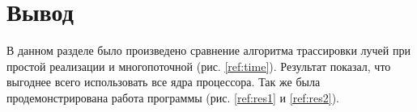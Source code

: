 \begin{figure}[ht!]
\end{figure}

\begin{figure}[ht!]
\end{figure}

\section{Вывод}

В данном разделе было произведено сравнение алгоритма трассировки лучей
при простой реализации и многопоточной (рис. \ref{ref:time}).
Результат показал, что выгоднее всего использовать все ядра процессора.
Так же была продемонстрирована работа программы (рис. \ref{ref:res1} и \ref{ref:res2}).
